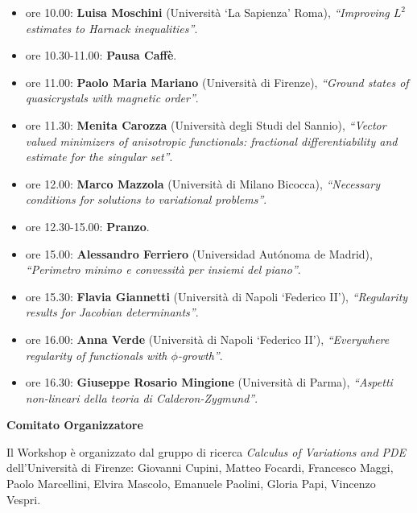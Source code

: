 \documentclass[12pt]{article}
\begin{document}
\begin{itemize}
\item{ore 10.00: {\bf  Luisa Moschini} (Universit\`a `La Sapienza' Roma),}
\emph{``Improving $L^2$ estimates to Harnack inequalities''}.

\item{ore 10.30-11.00: {\bf Pausa Caff\`e}.}

\item{ore 11.00: {\bf Paolo Maria Mariano} (Universit\`a di Firenze),}
\emph{``Ground states of quasicrystals with magnetic order''}.

\item{ore 11.30: {\bf Menita Carozza} (Universit\`a degli Studi del Sannio),}
\emph{``Vector valued minimizers of anisotropic functionals: fractional 
differentiability and estimate for the singular set''}.


\item{ore 12.00: {\bf  Marco Mazzola} (Universit\`a di Milano Bicocca),}
\emph{``Necessary conditions for solutions to variational problems''}.


\item{ore 12.30-15.00: {\bf Pranzo}.} 


\item{ore 15.00: {\bf Alessandro Ferriero} 
(Universidad Aut\'onoma de Madrid),} 
\emph{``Perimetro minimo e convessit\`a per insiemi del piano''}.




\item{ore 15.30: {\bf  Flavia Giannetti} 
(Universit\`a di Napoli `Federico II'),}
\emph{``Regularity results for Jacobian determinants''}.

\item{ore 16.00: {\bf Anna Verde} (Universit\`a di Napoli `Federico II'),}
\emph{``Everywhere regularity of functionals with $\phi$-growth''}.

\item{ore 16.30: {\bf Giuseppe Rosario Mingione} (Universit\`a di Parma),}
\emph{``Aspetti non-lineari della teoria di Calderon-Zygmund''}.

\end{itemize}

\vfill

\centerline{\bf Comitato Organizzatore}
\noindent
Il Workshop \`e organizzato dal gruppo di ricerca 
\emph{Calculus of Variations and PDE} dell'Universit\`a di Firenze: 
Giovanni Cupini,
Matteo Focardi,
Francesco Maggi,
Paolo Marcellini,
Elvira Mascolo,
Emanuele Paolini,
Gloria Papi,
Vincenzo Vespri.
\end{document}
